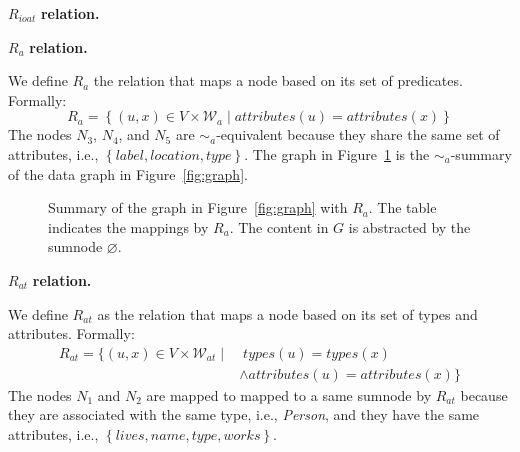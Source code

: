 \begin{labeling}{$R_{ioat}$ \textbf{relation.}}
\item[$R_a$ \textbf{relation.}]

We define $R_a$ the relation that maps a node based on its set of predicates. Formally:
$$
R_a = \left\lbrace (u, x) \in V \times \mathcal{W}_a \mid attributes(u) = attributes(x) \right\rbrace
$$
The nodes $N_3$, $N_4$, and $N_5$ are $\sim_a$-equivalent because they share the same set of attributes, i.e., $\left\lbrace label, location, type \right\rbrace$. The graph in Figure~\ref{fig:attributes-summary} is the $\sim_a$-summary of the data graph in Figure~\ref{fig:graph}.

\begin{figure}
	\centering
	\begin{minipage}{.75\textwidth}
		\resizebox{\textwidth}{!}{
			
		}
	\end{minipage}
	\quad
	\begin{minipage}[h]{.2\textwidth}
		\centering
		\caption*{$R_a\left(V, \mathcal{W}\right)$}
	\end{minipage}
	\caption{Summary of the graph in Figure~\ref{fig:graph} with $R_a$. The table indicates the mappings by $R_a$. The content in $G$ is abstracted by the sumnode $\varnothing$.}
	\label{fig:attributes-summary}
\end{figure}

\item[$R_{at}$ \textbf{relation.}]

We define $R_{at}$ as the relation that maps a node based on its set of types and attributes. Formally:
$$
\begin{aligned}
R_{at} = \{ (u, x) \in V \times \mathcal{W}_{at} \mid &\; types(u) = types(x) \\
& \wedge attributes(u) = attributes(x) \}
\end{aligned}
$$
The nodes $N_1$ and $N_2$ are mapped to mapped to a same sumnode by $R_{at}$ because they are associated with the same type, i.e., \emph{Person}, and they have the same attributes, i.e., $\left\lbrace lives, name, type, works \right\rbrace$.


\end{labeling}
